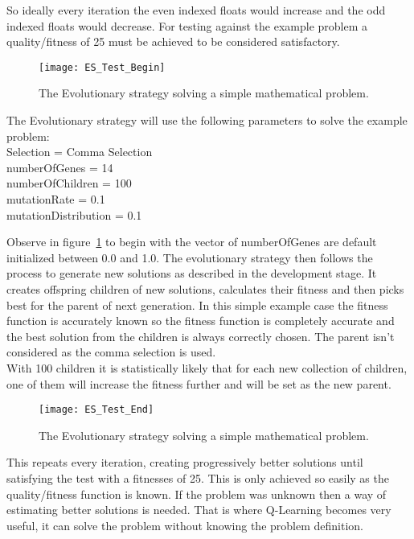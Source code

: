 \documentclass{report}
\begin{document}
So ideally every iteration the even indexed floats would increase and the odd indexed floats would decrease. For testing against the example problem a quality/fitness
of 25 must be achieved to be considered satisfactory.

\begin{figure}
\centerline{\texttt{[image: ES\_Test\_Begin]}}
\caption[Evolutionary Strategy Test: Console Output Start]{}
\label{fgr:estcos}
\centerline{The Evolutionary strategy solving a simple mathematical problem.}
\end{figure}

The Evolutionary strategy will use the following parameters to solve the example problem:\\
Selection = Comma Selection\\
numberOfGenes = 14\\
numberOfChildren = 100\\
mutationRate = 	0.1\\
mutationDistribution = 0.1

Observe in figure~\ref{fgr:estcos} to begin with the vector of numberOfGenes are default initialized between 0.0 and 1.0. The evolutionary strategy then follows the process to generate new solutions
as described in the development stage. It creates offspring children of new solutions, calculates their fitness and then picks best for the parent of next generation. In this simple 
example case the fitness function is accurately known so the fitness function is completely accurate and the best solution from the children is always correctly chosen. The parent 
isn't considered as the comma selection is used.\\
With 100 children it is statistically likely that for each new collection of children, one of them will increase the fitness further and will be set as the new parent.

\begin{figure}
\centerline{\texttt{[image: ES\_Test\_End]}}
\caption[Evolutionary Strategy Test: Console Output Finished]{}
\label{fgr:estcof}
\centerline{The Evolutionary strategy solving a simple mathematical problem.}
\end{figure}

This repeats every iteration, creating progressively better solutions until satisfying the test with a fitnesses of 25. This is only achieved so easily as the 
quality/fitness function is known. If the problem was unknown then a way of estimating better solutions is needed. That is where Q-Learning becomes very useful,
it can solve the problem without knowing the problem definition.
\end{document}
